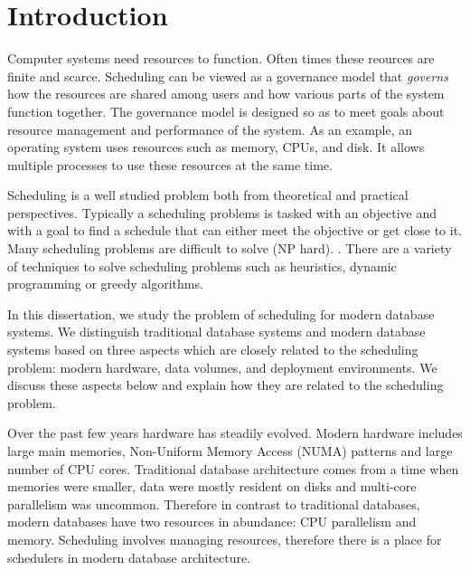\chapter{Introduction}
Computer systems need resources to function. 
Often times these reources are finite and scarce. 
Scheduling can be viewed as a governance model that \textit{governs} how the resources are shared among users and how various parts of the system function together. 
The governance model is designed so as to meet goals about resource management and performance of the system. 
As an example, an operating system uses resources such as memory, CPUs, and disk.
It allows multiple processes to use these resources at the same time. 

Scheduling is a well studied problem both from theoretical and practical perspectives. 
Typically a scheduling problems is tasked with an objective and with a goal to find a schedule that can either meet the objective or get close to it.
Many scheduling problems are difficult to solve (NP hard).
.
There are a variety of techniques to solve scheduling problems such as heuristics, dynamic programming or greedy algorithms. 

In this dissertation, we study the problem of scheduling for modern database systems.
We distinguish traditional database systems and modern database systems based on three aspects which are closely related to the scheduling problem: modern hardware, data volumes, and deployment environments.
We discuss these aspects below and explain how they are related to the scheduling problem. 

Over the past few years hardware has steadily evolved. 
Modern hardware includes large main memories, Non-Uniform Memory Access (NUMA) patterns and large number of CPU cores.
Traditional database architecture comes from a time when memories were smaller, data were mostly resident on disks and multi-core parallelism was uncommon. 
Therefore in contrast to traditional databases, modern databases have two resources in abundance: CPU parallelism and memory.
Scheduling involves managing resources, therefore there is a place for schedulers in modern database architecture. 

